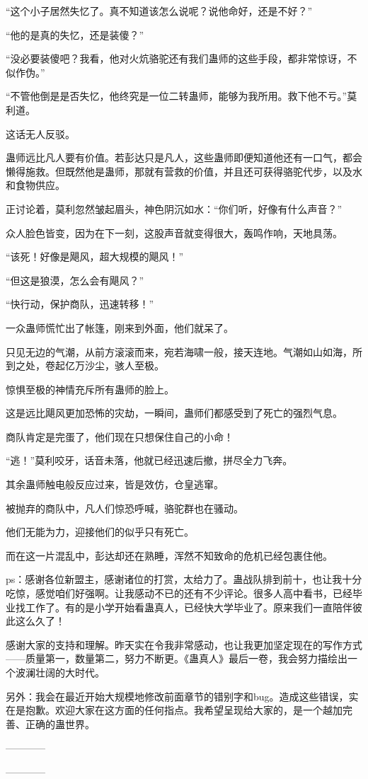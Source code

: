 \begin{this_body}
“这个小子居然失忆了。真不知道该怎么说呢？说他命好，还是不好？”

“他的是真的失忆，还是装傻？”

“没必要装傻吧？我看，他对火炕骆驼还有我们蛊师的这些手段，都非常惊讶，不似作伪。”

“不管他倒是是否失忆，他终究是一位二转蛊师，能够为我所用。救下他不亏。”莫利道。

这话无人反驳。

蛊师远比凡人要有价值。若彭达只是凡人，这些蛊师即便知道他还有一口气，都会懒得施救。但既然他是蛊师，那就有营救的价值，并且还可获得骆驼代步，以及水和食物供应。

正讨论着，莫利忽然皱起眉头，神色阴沉如水：“你们听，好像有什么声音？”

众人脸色皆变，因为在下一刻，这股声音就变得很大，轰鸣作响，天地具荡。

“该死！好像是飓风，超大规模的飓风！”

“但这是狼漠，怎么会有飓风？”

“快行动，保护商队，迅速转移！”

一众蛊师慌忙出了帐篷，刚来到外面，他们就呆了。

只见无边的气潮，从前方滚滚而来，宛若海啸一般，接天连地。气潮如山如海，所到之处，卷起亿万沙尘，骇人至极。

惊惧至极的神情充斥所有蛊师的脸上。

这是远比飓风更加恐怖的灾劫，一瞬间，蛊师们都感受到了死亡的强烈气息。

商队肯定是完蛋了，他们现在只想保住自己的小命！

“逃！”莫利咬牙，话音未落，他就已经迅速后撤，拼尽全力飞奔。

其余蛊师触电般反应过来，皆是效仿，仓皇逃窜。

被抛弃的商队中，凡人们惊恐呼喊，骆驼群也在骚动。

他们无能为力，迎接他们的似乎只有死亡。

而在这一片混乱中，彭达却还在熟睡，浑然不知致命的危机已经包裹住他。

ps：感谢各位新盟主，感谢诸位的打赏，太给力了。蛊战队排到前十，也让我十分吃惊，感觉咱们好强啊。让我感动不已的还有不少评论。很多人高中看书，已经毕业找工作了。有的是小学开始看蛊真人，已经快大学毕业了。原来我们一直陪伴彼此这么久了！

感谢大家的支持和理解。昨天实在令我非常感动，也让我更加坚定现在的写作方式——质量第一，数量第二，努力不断更。《蛊真人》最后一卷，我会努力描绘出一个波澜壮阔的大时代。

另外：我会在最近开始大规模地修改前面章节的错别字和bug。造成这些错误，实在是抱歉。欢迎大家在这方面的任何指点。我希望呈现给大家的，是一个越加完善、正确的蛊世界。

------------

------------

\end{this_body}

